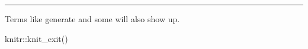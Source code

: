 \documentclass[
]{article}
\newenvironment{Shaded}{}{}
\newcommand{\FunctionTok}[1]{\textcolor[rgb]{0.02,0.16,0.49}{#1}}
\newcommand{\NormalTok}[1]{#1}
\newcommand{\SpecialCharTok}[1]{\textcolor[rgb]{0.25,0.44,0.63}{#1}}
\begin{document}
\begin{center}\rule{0.5\linewidth}{0.5pt}\end{center}

\newpage

Terms like generate and some will also
show up.

\printindex

\begin{Shaded}
\begin{Highlighting}[]
\NormalTok{    knitr}\SpecialCharTok{::}\FunctionTok{knit\_exit}\NormalTok{()}
\end{Highlighting}
\end{Shaded}
\end{document}
